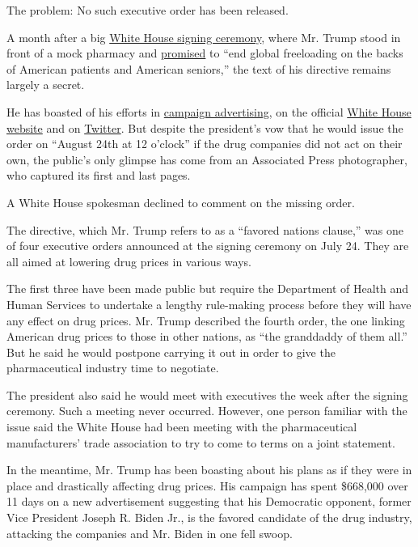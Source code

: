 The problem: No such executive order has been released.

A month after a big
\href{https://www.nytimes3xbfgragh.onion/2020/07/24/us/politics/trump-drug-prices-coronavirus.html}{White
House signing ceremony}, where Mr. Trump stood in front of a mock
pharmacy and
\href{https://www.whitehouse.gov/briefings-statements/remarks-president-trump-signing-executive-orders-lowering-drug-prices/}{promised}
to ``end global freeloading on the backs of American patients and
American seniors,'' the text of his directive remains largely a secret.

He has boasted of his efforts in
\href{https://host2.advertisinganalyticsllc.com/admo/viewer/a3536be1-fa99-41cd-96dd-f3a33180c0dc/}{campaign
advertising}, on the official
\href{https://www.whitehouse.gov/articles/congress-didnt-act-on-prescription-drug-prices-so-president-trump-did/}{White
House website} and on
\href{https://twitter.com/realDonaldTrump/status/1297329827859632130}{Twitter}.
But despite the president's vow that he would issue the order on
``August 24th at 12 o'clock'' if the drug companies did not act on their
own, the public's only glimpse has come from an Associated Press
photographer, who captured its first and last pages.

A White House spokesman declined to comment on the missing order.

The directive, which Mr. Trump refers to as a ``favored nations
clause,'' was one of four executive orders announced at the signing
ceremony on July 24. They are all aimed at lowering drug prices in
various ways.

The first three have been made public but require the Department of
Health and Human Services to undertake a lengthy rule-making process
before they will have any effect on drug prices. Mr. Trump described the
fourth order, the one linking American drug prices to those in other
nations, as ``the granddaddy of them all.'' But he said he would
postpone carrying it out in order to give the pharmaceutical industry
time to negotiate.

The president also said he would meet with executives the week after the
signing ceremony. Such a meeting never occurred. However, one person
familiar with the issue said the White House had been meeting with the
pharmaceutical manufacturers' trade association to try to come to terms
on a joint statement.

In the meantime, Mr. Trump has been boasting about his plans as if they
were in place and drastically affecting drug prices. His campaign has
spent \$668,000 over 11 days on a new advertisement suggesting that his
Democratic opponent, former Vice President Joseph R. Biden Jr., is the
favored candidate of the drug industry, attacking the companies and Mr.
Biden in one fell swoop.

